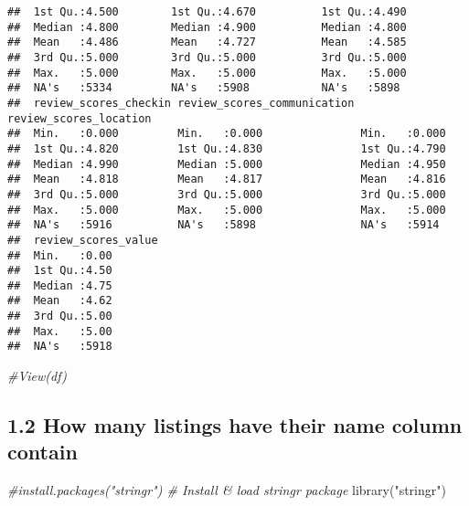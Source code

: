 \documentclass[
]{article}
\newenvironment{Shaded}{\begin{snugshade}}{\end{snugshade}}
\newcommand{\CommentTok}[1]{\textcolor[rgb]{0.56,0.35,0.01}{\textit{#1}}}
\newcommand{\FunctionTok}[1]{\textcolor[rgb]{0.00,0.00,0.00}{#1}}
\newcommand{\NormalTok}[1]{#1}
\newcommand{\StringTok}[1]{\textcolor[rgb]{0.31,0.60,0.02}{#1}}
\begin{document}
\begin{verbatim}
##  1st Qu.:4.500        1st Qu.:4.670          1st Qu.:4.490            
##  Median :4.800        Median :4.900          Median :4.800            
##  Mean   :4.486        Mean   :4.727          Mean   :4.585            
##  3rd Qu.:5.000        3rd Qu.:5.000          3rd Qu.:5.000            
##  Max.   :5.000        Max.   :5.000          Max.   :5.000            
##  NA's   :5334         NA's   :5908           NA's   :5898             
##  review_scores_checkin review_scores_communication review_scores_location
##  Min.   :0.000         Min.   :0.000               Min.   :0.000         
##  1st Qu.:4.820         1st Qu.:4.830               1st Qu.:4.790         
##  Median :4.990         Median :5.000               Median :4.950         
##  Mean   :4.818         Mean   :4.817               Mean   :4.816         
##  3rd Qu.:5.000         3rd Qu.:5.000               3rd Qu.:5.000         
##  Max.   :5.000         Max.   :5.000               Max.   :5.000         
##  NA's   :5916          NA's   :5898                NA's   :5914          
##  review_scores_value
##  Min.   :0.00       
##  1st Qu.:4.50       
##  Median :4.75       
##  Mean   :4.62       
##  3rd Qu.:5.00       
##  Max.   :5.00       
##  NA's   :5918
\end{verbatim}

\begin{Shaded}
\begin{Highlighting}[]
\CommentTok{\#View(df)}
\end{Highlighting}
\end{Shaded}

\hypertarget{how-many-listings-have-their-name-column-contain}{%
\subsection{1.2 How many listings have their name column
contain}\label{how-many-listings-have-their-name-column-contain}}

\begin{Shaded}
\begin{Highlighting}[]
\CommentTok{\#install.packages("stringr")     \# Install \& load stringr package}
\FunctionTok{library}\NormalTok{(}\StringTok{"stringr"}\NormalTok{)}
\end{Highlighting}
\end{Shaded}
\end{document}
